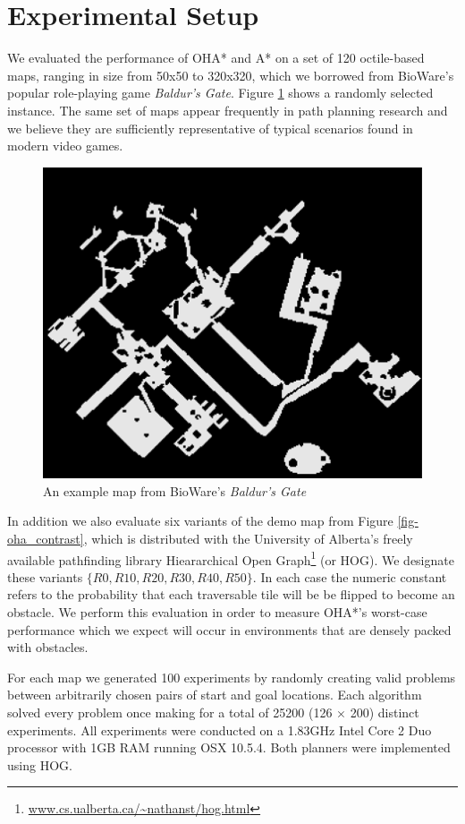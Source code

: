 \section{Experimental Setup}
We evaluated the performance of OHA* and A* on a set of 120 octile-based maps, ranging in size from 50x50 
to 320x320, which we borrowed from BioWare's popular role-playing game \emph{Baldur's Gate}. 
Figure \ref{fig-bgmap} shows a randomly selected instance. 
The same set of maps appear frequently in path planning research 
\cite{botea04,sturtevant05,harabor08} and we believe they are sufficiently representative 
of typical scenarios found in modern video games. 
\begin{figure}[htbp]
       \begin{center}
                       \includegraphics[scale=0.50, trim = 10mm 10mm 10mm 0mm]{diagrams/bgmap.png}
       \end{center}
	\vspace{-3pt}
       \caption{An example map from BioWare's \emph{Baldur's Gate}}
       \label{fig-bgmap}
	\vspace{-12pt}
\end{figure}
In addition we also evaluate six variants of the demo map from Figure \ref{fig-oha_contrast},
 which is distributed with the University of Alberta's freely available pathfinding library 
Hieararchical Open Graph\footnote{\url{www.cs.ualberta.ca/~nathanst/hog.html}} (or HOG).
We designate these variants $\lbrace R0, R10, R20, R30, R40, R50 \rbrace$. 
In each case the numeric constant refers to the probability that each traversable tile will be be flipped to 
become an obstacle.
We perform this evaluation in order to measure OHA*'s worst-case performance which we expect will occur in 
environments that are densely packed with obstacles.
\par
For each map we generated 100 experiments by randomly creating valid problems between arbitrarily chosen 
pairs of start and goal locations.
Each algorithm solved every problem once making for a total of 25200 (126 $\times$ 200) distinct experiments.
All experiments were conducted on a 1.83GHz Intel Core 2 Duo processor with 1GB RAM running OSX 10.5.4.
Both planners were implemented using HOG. 
